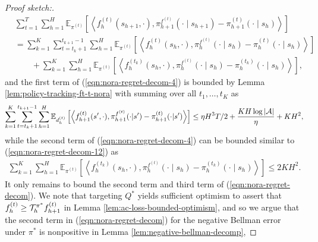 \begin{proof}[Proof sketch:]
\begin{align}
     &\sum_{t=1}^T \sum_{h=1}^H \mathbb{E}_{\pi^{(t)}}\left[\left\langle f_h^{(t)}\left(s_{h+1}, \cdot\right), \pi_{h+1}^{f^{(t)}}\left(\cdot \mid s_{h+1}\right)-\pi_{h+1}^{(t)}\left(\cdot \mid s_h\right)\right\rangle\right] \nonumber\\
        &= \sum_{k=1}^{K} \sum_{t=t_{k}+1}^{t_{k+1}-1} \sum_{h=1}^H \mathbb{E}_{\pi^{(t)}}\left[\left\langle f_h^{(t)}\left(s_h, \cdot\right), \pi_h^{f^{(t)}}\left(\cdot \mid s_h\right)-\pi_h^{(t)}\left(\cdot \mid s_h\right)\right\rangle\right] \nonumber\\
        &\qquad+ \sum_{k=1}^{K}\sum_{h=1}^H \mathbb{E}_{\pi^{(t)}}\left[\left\langle f_h^{(t_k)}\left(s_h, \cdot\right), \pi_h^{f^{(t)}}\left(\cdot \mid s_h\right)-\pi_h^{(t_k)}\left(\cdot \mid s_h\right)\right\rangle\right],
 \end{align}
 and the first term of (\ref{eqn:nora-regret-decom-4}) is bounded by Lemma \ref{lem:policy-tracking-ft-t-nora} with summing over all $t_1,\ldots,t_K$ as
 \begin{align}\label{eqn:nora-regret-decom-41}
     \sum_{k=1}^{K}\sum_{t=t_k+1}^{t_{k+1}-1} \sum_{h=1}^H \mathbb{E}_{d_h^{(t)}}\left[\left\langle f_{h+1}^{(t)}(s', \cdot) , \pi_{h+1}^{f^{(t)}}(\cdot | s') - \pi_{h+1}^{(t)} (\cdot | s')\right\rangle\right] \leq \eta H^3 T/2 + \frac{KH\log|{\mathcal{A}}|}{\eta} + KH^2,
 \end{align}
 while the second term of (\ref{eqn:nora-regret-decom-4}) can be bounded similar to (\ref{eqn:nora-regret-decom-12}) as
  \begin{align}\label{eqn:nora-regret-decom-42}
   \sum_{k=1}^{K}\sum_{h=1}^H \mathbb{E}_{\pi^{(t)}}\left[\left\langle f_h^{(t_k)}\left(s_h, \cdot\right), \pi_h^{f^{(t)}}\left(\cdot \mid s_h\right)-\pi_h^{(t_k)}\left(\cdot \mid s_h\right)\right\rangle\right]\leq 2KH^2.
 \end{align}
  It only remains to bound the second term and third term of (\ref{eqn:nora-regret-decom}). We note that targeting $Q^*$ yields sufficient optimism to assert that $f_h^{(t)} \geq {\mathcal{T}}_h^{\pi^{*}} f_{h+1}^{(t)}$ in Lemma \ref{lem:ac-loss-bounded-optimism}, and so we argue that the second term in (\ref{eqn:nora-regret-decom}) for the negative Bellman error under $\pi^*$ is nonpositive in Lemma \ref{lem:negative-bellman-decomp},

\end{proof}
